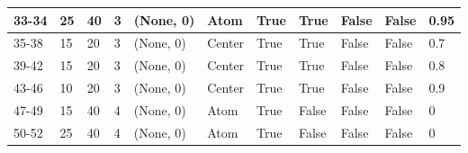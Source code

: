 \begin{longtable}{|C{0.9cm}|C{0.8cm}|C{0.8cm}|C{0.8cm}|C{3cm}|C{1.5cm}|C{1.5cm}|C{0.8cm}|C{0.8cm}|C{1cm}|C{1cm}|}
    33-34 &  25 &  40 &  3 & (None, 0) & Atom & True & True & False & False & 0.95 \\ \hline
    
    35-38 &  15 &  20 &  3 & (None, 0) & Center & True & True & False & False & 0.7 \\ \hline

    39-42 &  15 &  20 &  3 & (None, 0) & Center & True & True & False & False & 0.8 \\ \hline

    43-46 &  10 &  20 &  3 & (None, 0) & Center & True & True & False & False & 0.9 \\ \hline
    
    
    47-49 &  15 &  40 &  4 & (None, 0) & Atom & True & False & False & False & 0 \\ \hline

    50-52 &  25 &  40 &  4 & (None, 0) & Atom & True & False & False & False & 0 \\ \hline


\end{longtable}
